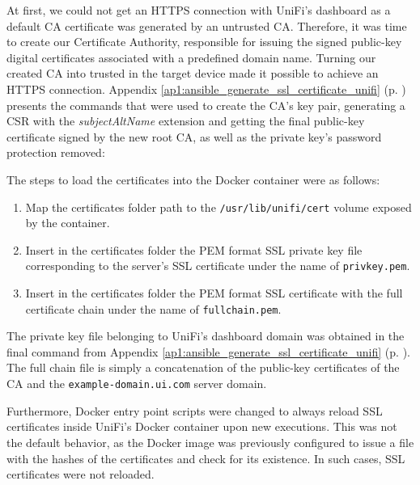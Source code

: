 At first, we could not get an HTTPS connection with UniFi's dashboard as a default CA certificate was generated by an untrusted CA. Therefore, it was time to create our Certificate Authority, responsible for issuing the signed public-key digital certificates associated with a predefined domain name. Turning our created CA into trusted in the target device made it possible to achieve an HTTPS connection. Appendix \ref{ap1:ansible_generate_ssl_certificate_unifi} (p. \pageref{ap1:ansible_generate_ssl_certificate_unifi}) presents the commands that were used to create the CA's key pair, generating a CSR with the \textit{subjectAltName} extension and getting the final public-key certificate signed by the new root CA, as well as the private key's password protection removed:


The steps to load the certificates into the Docker container were as follows:

\begin{enumerate}
    \item Map the certificates folder path to the \texttt{/usr/lib/unifi/cert} volume exposed by the container.
    \item Insert in the certificates folder the PEM format SSL private key file corresponding to the server's SSL certificate under the name of \texttt{privkey.pem}.
    \item Insert in the certificates folder the PEM format SSL certificate with the full certificate chain under the name of \texttt{fullchain.pem}.
\end{enumerate}

The private key file belonging to UniFi's dashboard domain was obtained in the final command from Appendix \ref{ap1:ansible_generate_ssl_certificate_unifi} (p. \pageref{ap1:ansible_generate_ssl_certificate_unifi}). The full chain file is simply a concatenation of the public-key certificates of the CA and the \texttt{example-domain.ui.com} server domain. 

Furthermore, Docker entry point scripts were changed to always reload SSL certificates inside UniFi's Docker container upon new executions. This was not the default behavior, as the Docker image was previously configured to issue a file with the hashes of the certificates and check for its existence. In such cases, SSL certificates were not reloaded.

